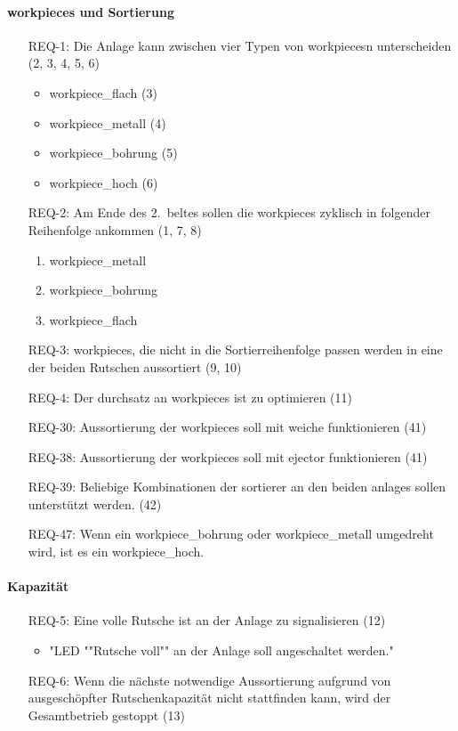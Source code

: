 \paragraph{\glspl{workpiece} und Sortierung}
\begin{itemize}
    \item[REQ-1:] Die Anlage kann zwischen vier Typen von \glspl{workpiece}n unterscheiden (2, 3, 4, 5, 6)
    \begin{itemize}
        \item \gls{workpiece_flach} (3)
        \item \gls{workpiece_metall} (4)
        \item \gls{workpiece_bohrung} (5)
        \item \gls{workpiece_hoch} (6)
    \end{itemize}
    \item[REQ-2:] Am Ende des 2.\ \gls{belt}es sollen die \glspl{workpiece} zyklisch in folgender Reihenfolge ankommen (1, 7, 8)
    \begin{enumerate}
        \item \gls{workpiece_metall}
        \item \gls{workpiece_bohrung}
        \item \gls{workpiece_flach}
    \end{enumerate}
    \item[REQ-3:] \glspl{workpiece}, die nicht in die Sortierreihenfolge passen werden in eine der beiden Rutschen aussortiert (9, 10)
    \item[REQ-4:] Der \gls{durchsatz} an \glspl{workpiece} ist zu optimieren (11)
    \item[REQ-30:] Aussortierung der \glspl{workpiece} soll mit \gls{weiche} funktionieren (41)
    \item[REQ-38:] Aussortierung der \glspl{workpiece} soll mit \gls{ejector} funktionieren (41)
    \item[REQ-39:] Beliebige Kombinationen der \gls{sortierer} an den beiden \glspl{anlage} sollen unterstützt werden. (42)
    \item[REQ-47:] Wenn ein \gls{workpiece_bohrung} oder \gls{workpiece_metall} umgedreht wird, ist es ein \gls{workpiece_hoch}.
\end{itemize}

\paragraph{Kapazität}
\begin{itemize}
    \item[REQ-5:] Eine volle Rutsche ist an der Anlage zu signalisieren (12)
    \begin{itemize}
        \item "LED ""Rutsche voll"" an der Anlage soll angeschaltet werden."
    \end{itemize}
    \item[REQ-6:] Wenn die nächste notwendige Aussortierung aufgrund von ausgeschöpfter Rutschenkapazität
    nicht stattfinden kann, wird der Gesamtbetrieb gestoppt (13)
\end{itemize}

